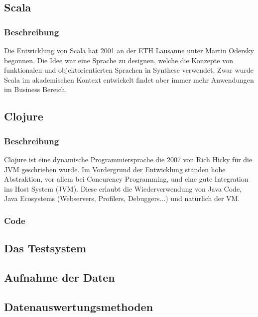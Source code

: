 \documentclass{fancydocument}
\begin{document}
\subsection{Scala}

\subsubsection{Beschreibung}

Die Entwicklung von Scala hat 2001 an der ETH Lausanne unter Martin
Odersky begonnen. Die Idee war eine Sprache zu designen, welche die
Konzepte von funktionalen und objektorientierten Sprachen in Synthese
verwendet. Zwar wurde Scala im akademischen Kontext entwickelt findet
aber immer mehr Anwendungen im Business Bereich.

\subsection{Clojure}
\subsubsection{Beschreibung}

Clojure ist eine dynamische Programmiersprache die 2007 von Rich Hicky
für die JVM geschrieben wurde. Im Vordergrund der Entwicklung standen
hohe Abstraktion, vor allem bei Concurency Programming, und eine gute
Integration ins Host System (JVM). Diese erlaubt die Wiederverwendung von
Java Code, Java Ecosystems (Webservers, Profilers, Debuggers...) und natürlich der VM.

\subsubsection{Code}




\subsection{Das Testsystem}

\subsection{Aufnahme der Daten}

\subsection{Datenauswertungsmethoden}
\end{document}
